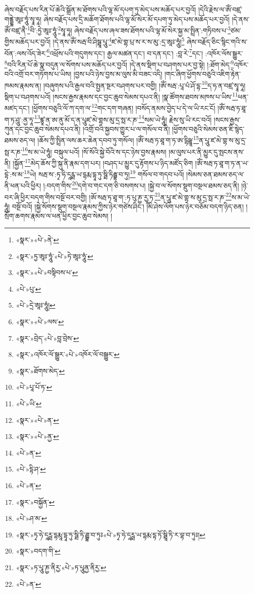 ཞེས་བརྗོད་པས་རིན་པོ་ཆེའི་སྒྲོན་མ་ཐོགས་པའི་ལྷ་མོ་དཔག་ཏུ་མེད་པས་མཆོད་པར་བྱའོ། །དེའི་རྗེས་ལ་ཨོཾ་བཛྲ་གནྡྷེ་ཨཱཿ་ཧཱུཾ་སྭཱ་ཧཱ། ཞེས་བརྗོད་པས་དྲི་མཆོག་ཐོགས་པའི་ལྷ་མོ་སེར་མོ་དཔག་ཏུ་མེད་པས་མཆོད་པར་བྱའོ། །དེ་ནས་ཨོཾ་བཛྲ་ནཻ་\footnote{«སྣར་»«པེ་»ནེ་}བི་:ཏྱེ་ཨཱཿ་ཧཱུཾ་\footnote{«སྣར་»ཏྱ་ཨཱཿ་ཧཱུཾ་«པེ་»ཏེ་ཨཱཿ་ཧཱུཾ་}སྭཱ་ཧཱ། ཞེས་བརྗོད་པས་ཞལ་ཟས་ཐོགས་པའི་ལྷ་མོ་སེར་སྐྱ་མ་སྤྲིན་:གཏིབས་པ་\footnote{«སྣར་»«པེ་»བསྟིབས་པ་}ཙམ་གྱིས་མཆོད་པར་བྱའོ། །དེ་ནས་ཨོཾ་སརྦ་བི་ཤིསྠཱ་པཱུ་\footnote{«པེ་»པུ་}ཛ་མེ་གྷ་པྲ་ས་ར་ས་མུ་:དྲ་ཨཱཿ་ཧཱུཾ།\footnote{«པེ་»དྲེ་ཨཱཿ་ཧཱུཾ།} ཞེས་བརྗོད་ཅིང་སྙིང་གའི་ས་བོན་:ལས་འོད་ཟེར་\footnote{«སྣར་»«པེ་»ལས་}འཕྲོས་པའི་གདུགས་དང་། རྒྱལ་མཚན་དང་། བ་དན་དང་། :བླ་རེ་\footnote{«སྣར་»བྲེད་«པེ་»བླ་བྲེས་}དང་། :འཁོར་ལོས་སྒྱུར་\footnote{«སྣར་»འཁོར་ལོ་སྒྱུར་«པེ་»འཁོར་ལོ་བསྒྱུར་}བའི་རིན་པོ་ཆེ་སྣ་བདུན་ལ་སོགས་པས་མཆོད་པར་བྱའོ། །དེ་ནས་སྡིག་པ་བཤགས་པར་བྱ་སྟེ། །:ཐོག་མེད་\footnote{«སྣར་»ཐོགས་མེད་}འཁོར་བའི་འགྲོ་བར་གཏོགས་པ་ཡིས། །བྱས་པའི་ཉེས་བྱས་མ་ལུས་མི་བཟང་འདི། །གང་ཞིག་ཕྱོགས་བཅུའི་འཇིག་རྟེན་ཁམས་རྣམས་ན། །བཞུགས་པའི་རྒྱལ་བའི་སྤྱན་སྔར་བཤགས་པར་བགྱི། །ཨོཾ་སརྦ་:པཱ་པཾ་ཤོ་དྷ་\footnote{«པེ་»པཱ་པོ་ཏ་}ད་ཧ་ན་བཛྲ་སྭཱ་ཧཱ། སྡིག་པ་བཤགས་པའོ། །སངས་རྒྱས་རྣམས་དང་བྱང་ཆུབ་སེམས་དཔའ་ནི། །སྣ་ཚོགས་ཐབས་མཁས་པ་ཡིས་\footnote{«པེ་»ཡི་}ཕན་མཛད་དང་། །ཕྱོགས་བཅུའི་ལོ་ཀ་དག་ལ་\footnote{«སྣར་»«པེ་»ན་}གང་དག་གཞན། །བསོད་ནམས་བྱེད་པ་དེ་ལ་ཡི་རང་ངོ། །ཨོཾ་སརྦ་ཏ་ཐཱ་ག་ཏ་ཤཱུ་:ནྱ་ཏཱ་\footnote{«སྣར་»«པེ་»ནྱ་}ཛྙཱ་ན་ཨ་ནུ་མོ་ད་ན་པཱུཛ་མེ་གྷས་མུ་དྲ་སྥ་ར་ཎ་\footnote{«པེ་»ན་}སམ་ཡེ་ཧཱུཾ། རྗེས་སུ་ཡི་རང་བའོ། །སངས་རྒྱས་ཀུན་དང་བྱང་ཆུབ་སེམས་དཔའ་ནི། །འགྲོ་བའི་སྐྱབས་གྱུར་པ་ལ་གསོལ་བ་ནི། །ཕྱོགས་བཅུའི་སེམས་ཅན་ཇི་སྙེད་ཐམས་ཅད་ལ། །ཆོས་ཀྱི་སྤྲིན་ལས་ཆར་ཆེན་དབབ་ཏུ་གསོལ། །ཨོཾ་སརྦ་ཏ་ཐཱ་ག་ཏ་ཨ་དྷིཥྛཱ་\footnote{«པེ་»དྷི་ཤ་}ན་པཱུ་ཛ་མེ་གྷ་ས་མུ་དྲ་སྥ་ར་ཎ་\footnote{«པེ་»ན་}ས་མ་ཡེ་ཧཱུཾ། བསྐུལ་པའོ། །སོ་སོའི་སྐྱེ་བོའི་ས་དང་ཉེས་བྱས་རྣམས། །མ་ལུས་པར་ནི་མྱུར་དུ་སྤངས་ནས་ནི། །སྐྱོན་\footnote{«སྣར་»བསྐྱོན་}མེད་ཆོས་ཀྱི་སྐུ་ནི་རྣམ་དག་པར། །བཤད་པ་མྱུར་དུ་རྟོགས་པ་ཉིད་མཛོད་ཅིག །ཨོཾ་སརྦ་ཏ་ཐཱ་ག་ཏ་ན་ཡ་དྷེ་:ས་མ་\footnote{«པེ་»ཤ་མ་}ཡེ། སརྦ་ས་:ཏྭ་ཧི་དཱཪྠ་ཡ་དྷརྨ་དྷཱ་ཏུ་སྠི་ཏིརྦྷ་བ་ཏུ།\footnote{«སྣར་»ཏྭ་ཧེ་དཱཪྠ་དྷརྨཱ་དྷཱ་ཏུ་སྠི་ཏི་ཌྦྷ་བ་ཏུཿ«པེ་»ཏྭ་ཧེ་དཱཪྠ་ཡ་དྷརྨ་དྷ་ཏོ་སྠཱི་ཏི་ར་བྷ་བ་ཏུཿ།} གསོལ་བ་གདབ་པའོ། །སེམས་ཅན་ཐམས་ཅད་ལ་ནི་ཕན་པའི་ཕྱིར། །:བདག་གིས་\footnote{«སྣར་»བདག་གི་}དགེ་བ་གང་དག་ཅི་བསགས་པ། །སྐྱེ་བ་ལ་སོགས་སྡུག་བསྔལ་ཐམས་ཅད་ནི། །ཉེ་བར་ཞི་ཕྱིར་བདག་གིས་བསྔོ་བར་བགྱི། །ཨོ་སརྦ་ཏ་ཐཱ་ག་:ཏ་པུ་ཎྱ་རྱཱ་ཏ་\footnote{«སྣར་»ཏ་པཱུ་ཎྱ་ནིརྱ་«པེ་»ཏ་པཱུནྱ་ནིརྱ་}ན་པཱུ་ཛ་མེ་གྷ་ས་མུ་དྲ་སྥ་ར་ཎ་\footnote{«པེ་»ན་}ས་མ་ཡེ་ཧཱུཾ། བསྔོ་བའོ། །སྐྱེ་སོགས་སྡུག་བསྔལ་རྣམས་ཀྱིས་ཉེར་གཙེས་ཤིང་། །མི་ཤེས་ལོག་པས་ཉེར་བཅོམ་བདག་ཉིད་ཅན། །སྲོག་ཆགས་རྣམས་ལ་ཕན་ཕྱིར་བྱང་ཆུབ་སེམས། །
